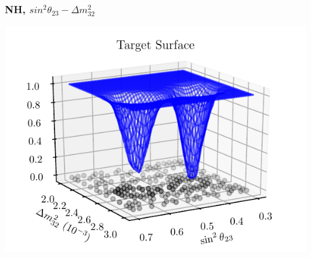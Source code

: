 \documentclass[9pt, aspectratio=169]{beamer}
\begin{document}
\begin{frame}
  \frametitle{NH, $sin^{2}\theta_{23}-\Delta m^{2}_{32}$}
  \centering
  \includegraphics[scale=0.75]{figures_final/target.pdf}
\end{frame}
\end{document}

